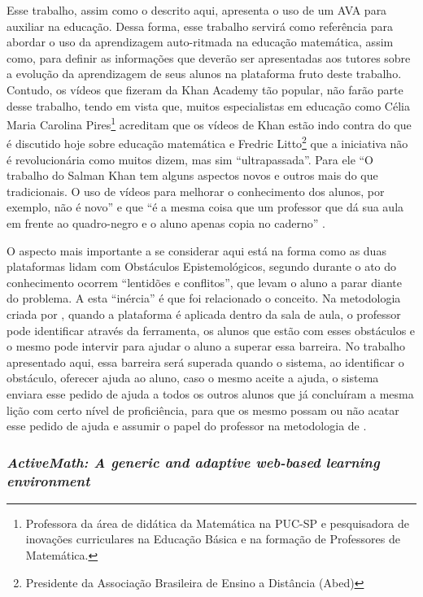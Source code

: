 Esse trabalho, assim como o descrito aqui, apresenta o uso de um AVA para auxiliar na educação. Dessa forma, esse trabalho servirá como referência para abordar o uso da aprendizagem auto-ritmada na 
educação matemática, assim como, para definir as informações que deverão ser apresentadas aos tutores sobre a evolução da aprendizagem de seus alunos na plataforma fruto deste trabalho. Contudo, os 
vídeos que fizeram da Khan Academy tão popular, não farão parte desse trabalho, tendo em vista que, muitos especialistas em educação como Célia Maria Carolina Pires\footnote{Professora da área de 
didática da Matemática na PUC-SP e pesquisadora de inovações curriculares na Educação Básica e na formação de Professores de Matemática.} acreditam que os vídeos de Khan estão indo contra do que é 
discutido hoje sobre educação matemática \cite{cartacapital2013} e Fredric Litto\footnote{Presidente da Associação Brasileira de Ensino a Distância (Abed)} que a iniciativa não é revolucionária como 
muitos dizem, mas sim ``ultrapassada''. Para ele ``O trabalho do Salman Khan tem alguns aspectos novos e outros mais do que tradicionais. O uso de vídeos para melhorar o conhecimento dos alunos, por 
exemplo, não é novo'' e que ``é a mesma coisa que um professor que dá sua aula em frente ao quadro-negro e o aluno apenas copia no caderno'' \cite{revistaeducacao2013}.

O aspecto mais importante a se considerar aqui está na forma como as duas plataformas lidam com Obstáculos Epistemológicos, segundo  durante o ato do conhecimento ocorrem ``lentidões e conflitos'', que levam o aluno a parar diante do problema. A esta ``inércia'' é que foi relacionado o conceito. Na metodologia criada por , quando a plataforma é aplicada dentro da sala de aula, o professor pode identificar através da ferramenta, os alunos que estão com esses obstáculos e o mesmo pode intervir para ajudar o aluno a superar essa barreira. No trabalho apresentado aqui, essa barreira será superada quando o sistema, ao identificar o obstáculo, oferecer ajuda ao aluno, caso o mesmo aceite a ajuda, o sistema enviara esse pedido de ajuda a todos os outros alunos que já concluíram a mesma lição com certo nível de proficiência, para que os mesmo possam ou não acatar esse pedido de ajuda e assumir o papel do professor na metodologia de . 


\subsubsection{\textit{ActiveMath: A generic and adaptive web-based learning environment}}

